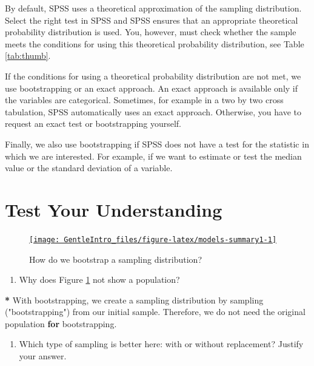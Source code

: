\documentclass[a4paper]{book}
\newenvironment{Shaded}{\begin{snugshade}}{\end{snugshade}}
\newcommand{\StringTok}[1]{\textcolor[rgb]{0.00,0.00,0.00}{#1}}
\newcommand{\ControlFlowTok}[1]{\textcolor[rgb]{0.00,0.00,0.00}{\textbf{#1}}}
\newcommand{\OperatorTok}[1]{\textcolor[rgb]{0.00,0.00,0.00}{\textbf{#1}}}
\newcommand{\NormalTok}[1]{#1}
\providecommand{\tightlist}{%
  \setlength{\itemsep}{0pt}\setlength{\parskip}{0pt}}
\theoremstyle{definition}
\theoremstyle{definition}
\theoremstyle{definition}
\theoremstyle{remark}
\begin{document}
By default, SPSS uses a theoretical approximation of the sampling
distribution. Select the right test in SPSS and SPSS ensures that an
appropriate theoretical probability distribution is used. You, however,
must check whether the sample meets the conditions for using this
theoretical probability distribution, see Table \ref{tab:thumb}.

If the conditions for using a theoretical probability distribution are
not met, we use bootstrapping or an exact approach. An exact approach is
available only if the variables are categorical. Sometimes, for example
in a two by two cross tabulation, SPSS automatically uses an exact
approach. Otherwise, you have to request an exact test or bootstrapping
yourself.

Finally, we also use bootstrapping if SPSS does not have a test for the
statistic in which we are interested. For example, if we want to
estimate or test the median value or the standard deviation of a
variable.

\section{Test Your Understanding}\label{test-your-understanding-1}

\begin{figure}[H]
\href{http://82.196.4.233:3838/apps/bootstrapping/}{\texttt{[image: GentleIntro\_files/figure-latex/models-summary1-1]} }\caption{How do we bootstrap a sampling distribution?}\label{fig:models-summary1}
\end{figure}

\begin{enumerate}
\def\labelenumi{\arabic{enumi}.}
\tightlist
\item
  Why does Figure \ref{fig:models-summary1} not show a population?
\end{enumerate}

\begin{Shaded}
\begin{Highlighting}[]
\OperatorTok{*}\StringTok{ }\NormalTok{With bootstrapping, we create a sampling distribution by sampling}
\NormalTok{(}\StringTok{"bootstrapping"}\NormalTok{) from our initial sample. Therefore, we do not need the}
\NormalTok{original population }\ControlFlowTok{for}\NormalTok{ bootstrapping.}
\end{Highlighting}
\end{Shaded}

\begin{enumerate}
\def\labelenumi{\arabic{enumi}.}
\setcounter{enumi}{1}
\tightlist
\item
  Which type of sampling is better here: with or without replacement?
  Justify your answer.
\end{enumerate}
\end{document}
